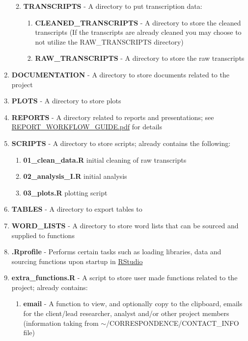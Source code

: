 \documentclass{article}\usepackage[]{graphicx}\usepackage[]{color}
\begin{document}
\begin{enumerate}
\begin{enumerate}
\begin{enumerate}
  \end{enumerate}  
      \item \textbf{TRANSCRIPTS} - A directory to put transcription data:
  \begin{enumerate}
  \item \textbf{CLEANED\_TRANSCRIPTS} - A directory to store the cleaned transcripts (If the transcripts are already cleaned you may choose to not utilize the RAW\_TRANSCRIPTS directory)
  \item \textbf{RAW\_TRANSCRIPTS} - A directory to store the raw transcripts
  \end{enumerate}      
    \end{enumerate}
  \item \textbf{DOCUMENTATION} - A directory to store documents related to the project
  \item \textbf{PLOTS} - A directory to store plots 
  \item \textbf{REPORTS} - A directory related to reports and presentations; see \href{https://dl.dropbox.com/u/61803503/packages/REPORT_WORKFLOW_GUIDE.pdf}{REPORT\_WORKFLOW\_GUIDE.pdf} for details
  \item \textbf{SCRIPTS} - A directory to store scripts; already contains the following:
    \begin{enumerate}
      \item \textbf{01\_clean\_data.R} initial cleaning of raw transcripts
      \item \textbf{02\_analysis\_I.R} initial analysis
      \item \textbf{03\_plots.R} plotting script
    \end{enumerate}
  \item \textbf{TABLES} - A directory to export tables to 
  \item \textbf{WORD\_LISTS} - A directory to store word lists that can be sourced and supplied to functions
  \item \textbf{.Rprofile} - Performs certain tasks such as loading libraries, 
      data and sourcing functions upon startup in \href{http://www.rstudio.com/}{RStudio}
  \item \textbf{extra\_functions.R} - A script to store user made functions related to the project; already contains:
  \begin{enumerate}
     \item \textbf{email} - A function to view, and optionally copy to the clipboard, emails for the client/lead researcher, analyst and/or other project members (information taking from \newline$\sim$/CORRESPONDENCE/CONTACT\_INFO file)

\end{enumerate}
\end{enumerate}
\end{document}
